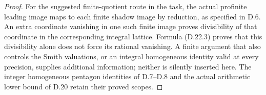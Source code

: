 \begin{proof}
For the suggested finite-quotient route in the task, the
actual profinite leading image maps to each finite shadow
image by reduction, as specified in D.6. An extra coordinate
vanishing in one such finite image proves divisibility of
that coordinate in the corresponding integral lattice.
Formula (D.22.3) proves that this divisibility alone does not
force its rational vanishing. A finite argument that also
controls the Smith valuations, or an integral homogeneous
identity valid at every precision, supplies additional
information; neither is silently inserted here. The integer
homogeneous pentagon identities of D.7--D.8 and the actual
arithmetic lower bound of D.20 retain their proved scopes.
\end{proof}

